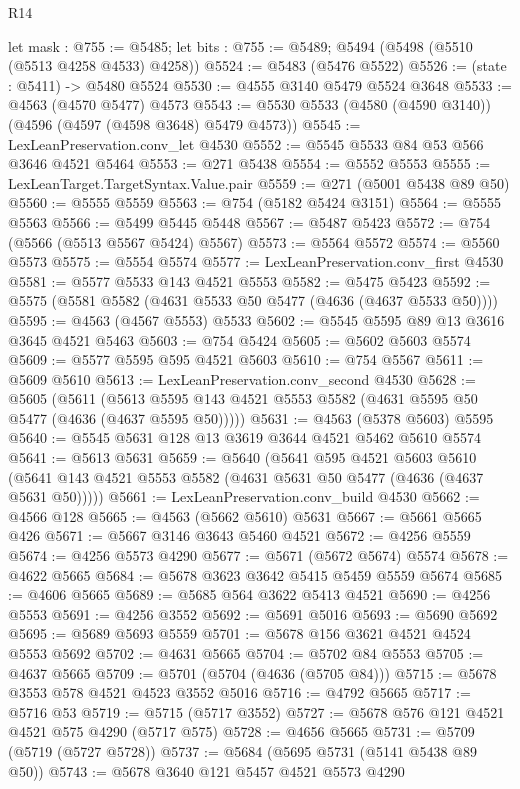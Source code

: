 \begin{lexlean}{R14}
\begin{coremodule}
  let mask : @755 := @5485;
  let bits : @755 := @5489; @5494 (@5498 (@5510 (@5513 @4258 @4533) @4258))
@5524 := @5483 (@5476 @5522)
@5526 := (state : @5411) -> @5480 @5524
@5530 := @4555 @3140 @5479 @5524 @3648
@5533 := @4563 (@4570 @5477) @4573
@5543 := @5530 @5533 (@4580 (@4590 @3140)) (@4596 (@4597 (@4598 @3648) @5479 @4573))
@5545 := LexLeanPreservation.conv_let @4530
@5552 := @5545 @5533 @84 @53 @566 @3646 @4521 @5464
@5553 := @271 @5438
@5554 := @5552 @5553
@5555 := LexLeanTarget.TargetSyntax.Value.pair
@5559 := @271 (@5001 @5438 @89 @50)
@5560 := @5555 @5559
@5563 := @754 (@5182 @5424 @3151)
@5564 := @5555 @5563
@5566 := @5499 @5445 @5448
@5567 := @5487 @5423
@5572 := @754 (@5566 (@5513 @5567 @5424) @5567)
@5573 := @5564 @5572
@5574 := @5560 @5573
@5575 := @5554 @5574
@5577 := LexLeanPreservation.conv_first @4530
@5581 := @5577 @5533 @143 @4521 @5553
@5582 := @5475 @5423
@5592 := @5575 (@5581 @5582 (@4631 @5533 @50 @5477 (@4636 (@4637 @5533 @50))))
@5595 := @4563 (@4567 @5553) @5533
@5602 := @5545 @5595 @89 @13 @3616 @3645 @4521 @5463
@5603 := @754 @5424
@5605 := @5602 @5603 @5574
@5609 := @5577 @5595 @595 @4521 @5603
@5610 := @754 @5567
@5611 := @5609 @5610
@5613 := LexLeanPreservation.conv_second @4530
@5628 := @5605
    (@5611 (@5613 @5595 @143 @4521 @5553 @5582 (@4631 @5595 @50 @5477 (@4636 (@4637 @5595 @50)))))
@5631 := @4563 (@5378 @5603) @5595
@5640 := @5545 @5631 @128 @13 @3619 @3644 @4521 @5462 @5610 @5574
@5641 := @5613 @5631
@5659 := @5640
    (@5641
      @595
      @4521
      @5603
      @5610
      (@5641 @143 @4521 @5553 @5582 (@4631 @5631 @50 @5477 (@4636 (@4637 @5631 @50)))))
@5661 := LexLeanPreservation.conv_build @4530
@5662 := @4566 @128
@5665 := @4563 (@5662 @5610) @5631
@5667 := @5661 @5665 @426
@5671 := @5667 @3146 @3643 @5460 @4521
@5672 := @4256 @5559
@5674 := @4256 @5573 @4290
@5677 := @5671 (@5672 @5674) @5574
@5678 := @4622 @5665
@5684 := @5678 @3623 @3642 @5415 @5459 @5559 @5674
@5685 := @4606 @5665
@5689 := @5685 @564 @3622 @5413 @4521
@5690 := @4256 @5553
@5691 := @4256 @3552
@5692 := @5691 @5016
@5693 := @5690 @5692
@5695 := @5689 @5693 @5559
@5701 := @5678 @156 @3621 @4521 @4524 @5553 @5692
@5702 := @4631 @5665
@5704 := @5702 @84 @5553
@5705 := @4637 @5665
@5709 := @5701 (@5704 (@4636 (@5705 @84)))
@5715 := @5678 @3553 @578 @4521 @4523 @3552 @5016
@5716 := @4792 @5665
@5717 := @5716 @53
@5719 := @5715 (@5717 @3552)
@5727 := @5678 @576 @121 @4521 @4521 @575 @4290 (@5717 @575)
@5728 := @4656 @5665
@5731 := @5709 (@5719 (@5727 @5728))
@5737 := @5684 (@5695 @5731 (@5141 @5438 @89 @50))
@5743 := @5678 @3640 @121 @5457 @4521 @5573 @4290

\end{coremodule}
\end{lexlean}
